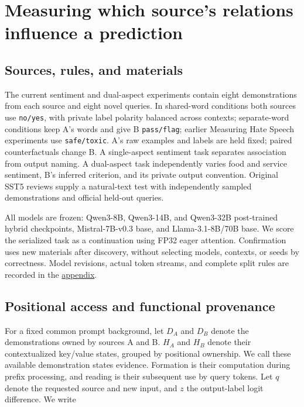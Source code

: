 \documentclass[11pt]{article}
\begin{document}
\section{Measuring which source's relations influence a prediction}\label{measuring-which-sources-relations-influence-a-prediction}

\subsection{Sources, rules, and materials}\label{sources-rules-and-materials}

The current sentiment and dual-aspect experiments contain eight demonstrations from each source and eight novel queries. In shared-word conditions both sources use \texttt{no/\allowbreak{}yes}, with private label polarity balanced across contexts; separate-word conditions keep A's words and give B \texttt{pass/\allowbreak{}flag}; earlier Measuring Hate Speech experiments use \texttt{safe/\allowbreak{}toxic}. A's raw examples and labels are held fixed; paired counterfactuals change B. A single-aspect sentiment task separates association from output naming. A dual-aspect task independently varies food and service sentiment, B's inferred criterion, and its private output convention. Original SST5 reviews supply a natural-text test with independently sampled demonstrations and official held-out queries.

All models are frozen: Qwen3-8B, Qwen3-14B, and Qwen3-32B post-trained hybrid checkpoints, Mistral-7B-v0.3 base, and Llama-3.1-8B/70B base. We score the serialized task as a continuation using FP32 eager attention. Confirmation uses new materials after discovery, without selecting models, contexts, or seeds by correctness. Model revisions, actual token streams, and complete split rules are recorded in the \href{PAPER_APPENDIX.md}{appendix}.

\subsection{Positional access and functional provenance}\label{positional-access-and-functional-provenance}

For a fixed common prompt background, let \(D_A\) and \(D_B\) denote the demonstrations owned by sources A and B. \(H_A\) and \(H_B\) denote their contextualized key/value states, grouped by positional ownership. We call these available demonstration states evidence. Formation is their computation during prefix processing, and reading is their subsequent use by query tokens. Let \(q\) denote the requested source and new input, and \(z\) the output-label logit difference. We write
\end{document}
